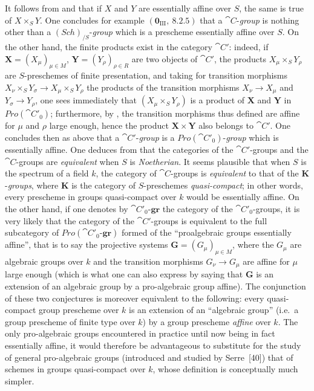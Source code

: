 \begin{remark}[8.13.6]
\label{IV.8.13.6}
It follows from  and  that if $X$ and $Y$ are essentially affine over $S$, the same is true of $X\times_S Y$.
One concludes for example $(\mathbf{0}_{\text{III}},~8.2.5)$ that a $\cat{C}$-\emph{group} is nothing other than a $(\boldsymbol{\mathit{Sch}})_{/S}$-\emph{group} which is a prescheme essentially affine over $S$.
On the other hand, the finite products exist in the category $\cat{C}'$: indeed, if $\mathbf{X}=(X_\mu)_{\mu\in M}$, $\mathbf{Y}=(Y_\rho)_{\rho\in R}$ are two objects of $\cat{C}'$, the products $X_\mu\times_S Y_\rho$ are $S$-preschemes of finite presentation, and taking for transition morphisms $X_\nu\times_S Y_\sigma\to X_\mu\times_S Y_\rho$ the products of the transition morphisms $X_\nu\to X_\mu$ and $Y_\sigma\to Y_\rho$, one sees immediately that $(X_\mu\times_S Y_\rho)$ is a product of $\mathbf{X}$ and $\mathbf{Y}$ in $\boldsymbol{\mathit{Pro}}(\cat{C}'_0)$; furthermore, by , the transition morphisms thus defined are affine for $\mu$ and $\rho$ large enough, hence the product $\mathbf{X}\times\mathbf{Y}$ also belongs to $\cat{C}'$.
One concludes then as above that a $\cat{C}'$-\emph{group} is a $\boldsymbol{\mathit{Pro}}(\cat{C}'_0)$-\emph{group} which is essentially affine.
One deduces from  that the categories of the $\cat{C}'$-groups and the $\cat{C}$-groups are \emph{equivalent} when $S$ is \emph{Noetherian}.
It seems plausible that when $S$ is the spectrum of a field $k$, the category of $\cat{C}$-groups is \emph{equivalent} to that of the $\boldsymbol{K}$-\emph{groups}, where $\boldsymbol{K}$ is the category of $S$-preschemes \emph{quasi-compact}; in other words, every prescheme in groups quasi-compact over $k$ would be essentially affine.
On the other hand, if one denotes
by $\cat{C}'_0$-$\boldsymbol{gr}$ the category of the $\cat{C}'_0$-groups, it is very likely that the category of the $\cat{C}'$-groups is equivalent to the full subcategory of $\boldsymbol{\mathit{Pro}}(\cat{C}'_0\text{-}\boldsymbol{gr})$ formed of the ``proalgebraic groups essentially affine'', that is to say the projective systems $\mathbf{G}=(G_\mu)_{\mu\in M}$, where the $G_\mu$ are algebraic groups over $k$ and the transition morphisms $G_\nu\to G_\mu$ are affine for $\mu$ large enough (which is what one can also express by saying that $\mathbf{G}$ is an extension of an algebraic group by a pro-algebraic group affine).
The conjunction of these two conjectures is moreover equivalent to the following: every quasi-compact group prescheme over $k$ is an extension of an ``algebraic group'' (i.e.\ a group prescheme of finite type over $k$) by a group prescheme \emph{affine} over $k$.
The only pro-algebraic groups encountered in practice until now being in fact essentially affine, it would therefore be advantageous to substitute for the study of general pro-algebraic groups (introduced and studied by Serre~[40]) that of schemes in groups quasi-compact over $k$, whose definition is conceptually much simpler.
\end{remark}

